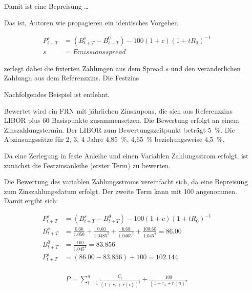 \documentclass[12pt, a4paper]{article}
\theoremstyle{plain}
\begin{document}

Damit ist eine Bepreisung \dots

Das ist, Autoren wie \textcite{veronesi_fixed_2010} propagieren ein identisches Vorgehen.

\begin{align*}
	P_{t+T}^{s}&=\left(B_{t+T}^{s}-B_{t+T}^{0}\right)-100(1+c)\left(1+t R_{0}\right)^{-1}\\
	s&= Emissionsspread
\end{align*}

\textcite[][]{alexander_market_2008} zerlegt dabei die fixierten Zahlungen aus dem Spread $s$ und den veränderlichen Zahlungn aus dem Referenzzins. Die Festzins

Nachfolgendes Beispiel ist \textcite[][32]{alexander_market_2008} entlehnt.

Bewertet wird ein \gls{FRN} mit jährlichen Zinskupons, die sich aus Referenzzins \gls{LIBOR} plus 60 Basispunkte zusammensetzen. Die Bewertung erfolgt an einem Zinszahlungstermin. Der \gls{LIBOR} zum Bewertungszeitpunkt beträgt 5~\%. Die Abzinsungssätze für 2, 3, 4 Jahre 4,85~\%, 4,65~\% beziehungsweise 4,5~\%.

Da eine Zerlegung in feste Anleihe und einen Variablen Zahlungsstrom erfolgt, ist zunächst die Festzinsanleihe (erster Term) zu bewerten.

Die Bewertung des variablen Zahlungsstroms vereinfacht sich, da eine Bepreisung zum Zinszahlungsdatum erfolgt. Der zweite Term kann mit 100 angenommen. Damit ergibt sich:

\begin{align*}
	P_{t+T}^{s}&=\left(B_{t+T}^{s}-B_{t+T}^{0}\right)-100(1+c)\left(1+t R_{0}\right)^{-1}\\
	B_{t+T}^{s}&=\frac{0.60}{1.050}+\frac{0.60}{1.0485^2}+\frac{0.60}{1.0465^3}+\frac{100.60}{1.045^4}=86.00\\
	B_{t+T}^{0}&=\frac{100}{1.045^4}=83.856\\
	P_{t+T}^{s}&= (86.00-83.856) + 100 = 102.144\\
\end{align*}


\begin{align*}
	P=\sum_{i=1}^{n} \frac{C_{i}}{\left(1+r_{s}+r(i)\right)^{i}}+\frac{100}{\left(1+r_{s}+r(n)^{n}\right.}
\end{align*}
\end{document}
